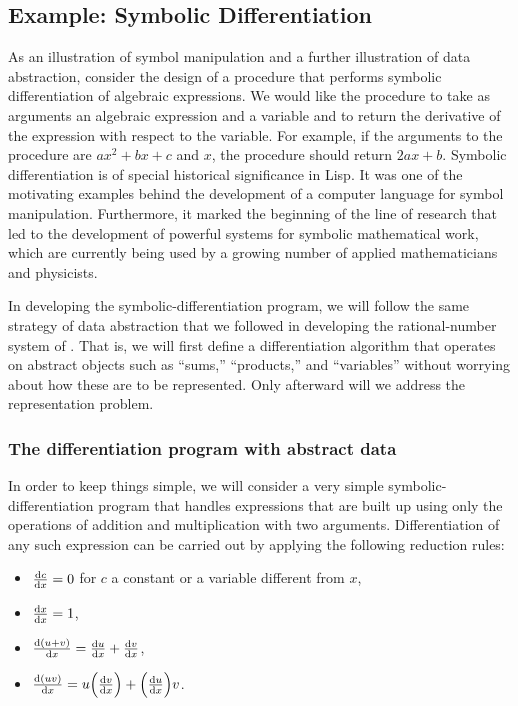\subsection{Example: Symbolic Differentiation}
\label{Section 2.3.2}

As an illustration of symbol manipulation and a further illustration of data abstraction, consider the design of a procedure that performs symbolic differentiation of algebraic expressions.
We would like the procedure to take as arguments an algebraic expression and a variable and to return the derivative of the expression with respect to the variable.
For example, if the arguments to the procedure are \( a x^2 + b x + c \) and \( x \), the procedure should return \( 2a x + b \).
Symbolic differentiation is of special historical significance in Lisp.
It was one of the motivating examples behind the development of a computer language for symbol manipulation.
Furthermore, it marked the beginning of the line of research that led to the development of powerful systems for symbolic mathematical work, which are currently being used by a growing number of applied mathematicians and physicists.

In developing the symbolic-differentiation program, we will follow the same strategy of data abstraction that we followed in developing the rational-number system of .
That is, we will first define a differentiation algorithm that operates on abstract objects such as “sums,” “products,” and “variables” without worrying about how these are to be represented.
Only afterward will we address the representation problem.



\subsubsection*{The differentiation program with abstract data}

In order to keep things simple, we will consider a very simple symbolic-differentiation program that handles expressions that are built up using only the operations of addition and multiplication with two arguments.
Differentiation of any such expression can be carried out by applying the following reduction rules:
\begin{itemize}

	\item
		\( \frac{\mathrm{d} c}{\mathrm{d} x} = 0 \) for \( c \) a constant or a variable different from \( x \),

	\item
		\( \frac{\mathrm{d} x}{\mathrm{d} x} = 1 \),

	\item
		\( \frac{\mathrm{d} (u + v)}{\mathrm{d} x} = \frac{\mathrm{d} u}{\mathrm{d} x} + \frac{\mathrm{d} v}{\mathrm{d} x} \),

	\item
		\( \frac{\mathrm{d} (uv)}{\mathrm{d} x} = u \Bigl( \frac{\mathrm{d} v}{\mathrm{d} x} \Bigr) + \Bigl( \frac{\mathrm{d} u}{\mathrm{d} x} \Bigr) v \).
\end{itemize}

